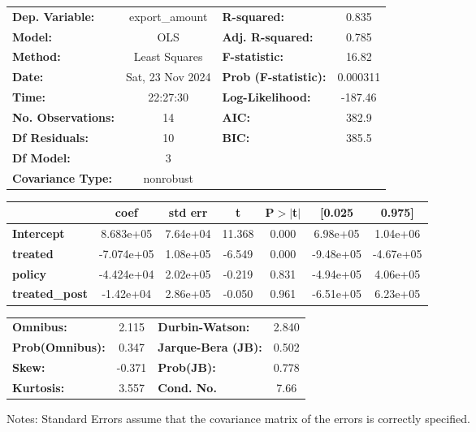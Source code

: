 \begin{center}
\begin{tabular}{lclc}
\toprule
\textbf{Dep. Variable:}    &  export\_amount  & \textbf{  R-squared:         } &     0.835   \\
\textbf{Model:}            &       OLS        & \textbf{  Adj. R-squared:    } &     0.785   \\
\textbf{Method:}           &  Least Squares   & \textbf{  F-statistic:       } &     16.82   \\
\textbf{Date:}             & Sat, 23 Nov 2024 & \textbf{  Prob (F-statistic):} &  0.000311   \\
\textbf{Time:}             &     22:27:30     & \textbf{  Log-Likelihood:    } &   -187.46   \\
\textbf{No. Observations:} &          14      & \textbf{  AIC:               } &     382.9   \\
\textbf{Df Residuals:}     &          10      & \textbf{  BIC:               } &     385.5   \\
\textbf{Df Model:}         &           3      & \textbf{                     } &             \\
\textbf{Covariance Type:}  &    nonrobust     & \textbf{                     } &             \\
\bottomrule
\end{tabular}
\begin{tabular}{lcccccc}
                       & \textbf{coef} & \textbf{std err} & \textbf{t} & \textbf{P$> |$t$|$} & \textbf{[0.025} & \textbf{0.975]}  \\
\midrule
\textbf{Intercept}     &    8.683e+05  &     7.64e+04     &    11.368  &         0.000        &     6.98e+05    &     1.04e+06     \\
\textbf{treated}       &   -7.074e+05  &     1.08e+05     &    -6.549  &         0.000        &    -9.48e+05    &    -4.67e+05     \\
\textbf{policy}        &   -4.424e+04  &     2.02e+05     &    -0.219  &         0.831        &    -4.94e+05    &     4.06e+05     \\
\textbf{treated\_post} &    -1.42e+04  &     2.86e+05     &    -0.050  &         0.961        &    -6.51e+05    &     6.23e+05     \\
\bottomrule
\end{tabular}
\begin{tabular}{lclc}
\textbf{Omnibus:}       &  2.115 & \textbf{  Durbin-Watson:     } &    2.840  \\
\textbf{Prob(Omnibus):} &  0.347 & \textbf{  Jarque-Bera (JB):  } &    0.502  \\
\textbf{Skew:}          & -0.371 & \textbf{  Prob(JB):          } &    0.778  \\
\textbf{Kurtosis:}      &  3.557 & \textbf{  Cond. No.          } &     7.66  \\
\bottomrule
\end{tabular}
\end{center}

Notes: \newline
 [1] Standard Errors assume that the covariance matrix of the errors is correctly specified.